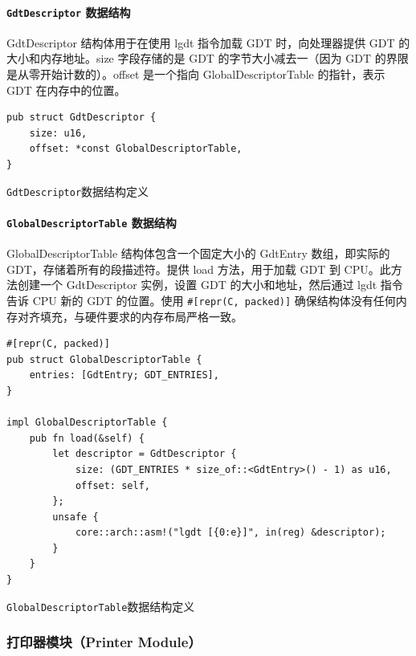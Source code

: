 \paragraph{\texttt{GdtDescriptor} 数据结构}

GdtDescriptor 结构体用于在使用 lgdt 指令加载 GDT 时，向处理器提供 GDT 的大小和内存地址。size 字段存储的是 GDT 的字节大小减去一（因为 GDT 的界限是从零开始计数的）。offset 是一个指向 GlobalDescriptorTable 的指针，表示 GDT 在内存中的位置。

\begin{listing}[htbp]
    \begin{verbatim}
pub struct GdtDescriptor {
    size: u16,
    offset: *const GlobalDescriptorTable,
}
    \end{verbatim}
    \caption{\texttt{GdtDescriptor}数据结构定义}\label{lst:GdtDescriptorDataStructure}
\end{listing}

\paragraph{\texttt{GlobalDescriptorTable} 数据结构}

GlobalDescriptorTable 结构体包含一个固定大小的 GdtEntry 数组，即实际的 GDT，存储着所有的段描述符。提供 load 方法，用于加载 GDT 到 CPU。此方法创建一个 GdtDescriptor 实例，设置 GDT 的大小和地址，然后通过 lgdt 指令告诉 CPU 新的 GDT 的位置。使用 \texttt{\#[repr(C, packed)]} 确保结构体没有任何内存对齐填充，与硬件要求的内存布局严格一致。

\begin{listing}[htbp]
    \begin{verbatim}
#[repr(C, packed)]
pub struct GlobalDescriptorTable {
    entries: [GdtEntry; GDT_ENTRIES],
}

impl GlobalDescriptorTable {
    pub fn load(&self) {
        let descriptor = GdtDescriptor {
            size: (GDT_ENTRIES * size_of::<GdtEntry>() - 1) as u16,
            offset: self,
        };
        unsafe {
            core::arch::asm!("lgdt [{0:e}]", in(reg) &descriptor);
        }
    }
}
    \end{verbatim}
    \caption{\texttt{GlobalDescriptorTable}数据结构定义}\label{lst:GlobalDescriptorTableDataStructure}
\end{listing}

\subsubsection{打印器模块（Printer Module）}

